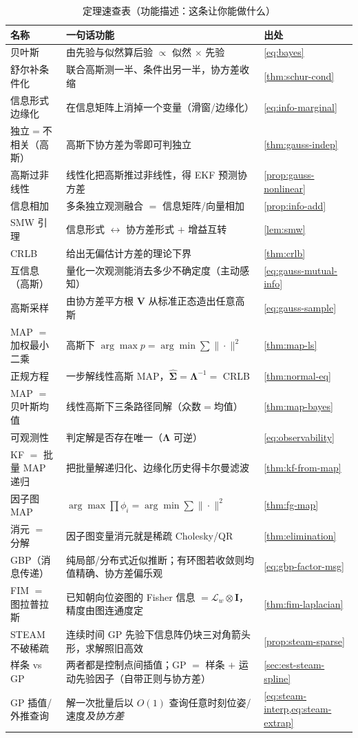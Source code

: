 \begin{table}[H]\centering\small
\caption{定理速查表（功能描述：这条让你能做什么）}
\begin{tabularx}{\linewidth}{lLl}
\toprule
名称 & 一句话功能 & 出处 \\
\midrule
贝叶斯 & 由先验与似然算后验 $\propto$ 似然 $\times$ 先验 & \cref{eq:bayes} \\
舒尔补条件化 & 联合高斯测一半、条件出另一半，协方差收缩 & \cref{thm:schur-cond} \\
信息形式边缘化 & 在信息矩阵上消掉一个变量（滑窗/边缘化） & \cref{eq:info-marginal} \\
独立$=$不相关（高斯） & 高斯下协方差为零即可判独立 & \cref{thm:gauss-indep} \\
高斯过非线性 & 线性化把高斯推过非线性，得 EKF 预测协方差 & \cref{prop:gauss-nonlinear} \\
信息相加 & 多条独立观测融合 $=$ 信息矩阵/向量相加 & \cref{prop:info-add} \\
SMW 引理 & 信息形式 $\leftrightarrow$ 协方差形式 $+$ 增益互转 & \cref{lem:smw} \\
CRLB & 给出无偏估计方差的理论下界 & \cref{thm:crlb} \\
互信息（高斯） & 量化一次观测能消去多少不确定度（主动感知） & \cref{eq:gauss-mutual-info} \\
高斯采样 & 由协方差平方根 $\mathbf{V}$ 从标准正态造出任意高斯 & \cref{eq:gauss-sample} \\
MAP $=$ 加权最小二乘 & 高斯下 $\arg\max p=\arg\min\sum\|\cdot\|^2$ & \cref{thm:map-ls} \\
正规方程 & 一步解线性高斯 MAP，$\hat{\boldsymbol{\Sigma}}=\boldsymbol{\Lambda}^{-1}=$ CRLB & \cref{thm:normal-eq} \\
MAP $=$ 贝叶斯均值 & 线性高斯下三条路径同解（众数$=$均值） & \cref{thm:map-bayes} \\
可观测性 & 判定解是否存在唯一（$\boldsymbol{\Lambda}$ 可逆） & \cref{eq:observability} \\
KF $=$ 批量 MAP 递归 & 把批量解递归化、边缘化历史得卡尔曼滤波 & \cref{thm:kf-from-map} \\
因子图 MAP & $\arg\max\prod\phi_i=\arg\min\sum\|\cdot\|^2$ & \cref{thm:fg-map} \\
消元 $=$ 分解 & 因子图变量消元就是稀疏 Cholesky/QR & \cref{thm:elimination} \\
GBP（消息传递） & 纯局部/分布式近似推断；有环图若收敛则均值精确、协方差偏乐观 & \cref{eq:gbp-factor-msg} \\
FIM $=$ 图拉普拉斯 & 已知朝向位姿图的 Fisher 信息 $=\boldsymbol{\mathcal{L}}_w\otimes\mathbf{I}$，精度由图连通度定 & \cref{thm:fim-laplacian} \\
STEAM 不破稀疏 & 连续时间 GP 先验下信息阵仍块三对角箭头形，求解照旧高效 & \cref{prop:steam-sparse} \\
样条 vs GP & 两者都是控制点间插值；GP $=$ 样条 $+$ 运动先验因子（自带正则与协方差） & \cref{sec:est-steam-spline} \\
GP 插值/外推查询 & 解一次批量后以 $O(1)$ 查询任意时刻位姿/速度\emph{及协方差} & \cref{eq:steam-interp,eq:steam-extrap} \\
\bottomrule
\end{tabularx}
\end{table}

